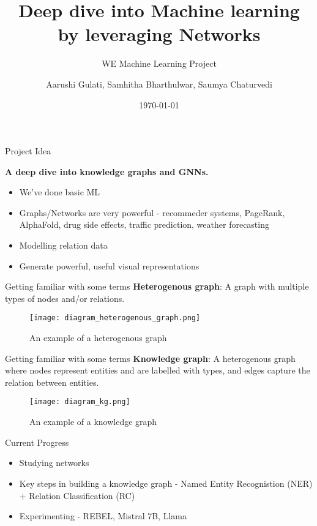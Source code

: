 \documentclass{beamer}
\title{Deep dive into Machine learning by leveraging Networks}
\subtitle{WE Machine Learning Project}
\author{Aarushi Gulati, Samhitha Bharthulwar, Saumya Chaturvedi}
\institute{WE Program Cohort 4}
\date{\today}
\begin{document}
\begin{frame}
\titlepage
\end{frame}


\begin{frame}{Project Idea}
    \begin{center}
        {\large \textbf{A deep dive into knowledge graphs and GNNs.}}
    \end{center}

    \begin{itemize}
        \item We've done basic ML 
        \item Graphs/Networks are very powerful - recommeder systems, PageRank, AlphaFold, drug side effects, traffic prediction, weather forecasting
        \item Modelling relation data
        \item Generate powerful, useful visual representations
    \end{itemize}
\end{frame}

\begin{frame}{Getting familiar with some terms}
    \textbf{Heterogenous graph}: A graph with multiple types of nodes and/or relations.
    \begin{figure}
        \texttt{[image: diagram\_heterogenous\_graph.png]}
        \caption{An example of a heterogenous graph \cite{course}}
        \label{fig:hg}
    \end{figure} 
\end{frame}

\begin{frame}{Getting familiar with some terms}
    \textbf{Knowledge graph}: A heterogenous graph where nodes represent entities and are labelled with types, and edges capture the relation between entities.
    \begin{figure}
            \texttt{[image: diagram\_kg.png]}
            \caption{An example of a knowledge graph \cite{course}}
            \label{fig:kg}
    \end{figure}
\end{frame}


\begin{frame}{Current Progress}
    \begin{itemize}
        \item Studying networks \cite{course}
        \item Key steps in building a knowledge graph - Named Entity Recognistion (NER) + Relation Classification (RC)
        \item Experimenting - REBEL, Mistral 7B, Llama
    \end{itemize}
\end{frame}
\end{document}
